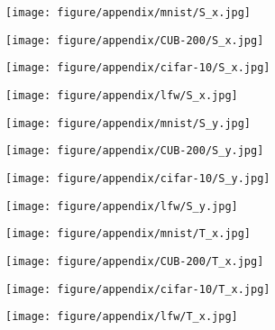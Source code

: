 \documentclass{article} \usepackage{iclr2017_conference,times}
\begin{document}
\begin{figure}[!ht]
\begin{minipage}{0.246\linewidth}
\center
\texttt{[image: figure/appendix/mnist/S\_x.jpg]}
\end{minipage}
\begin{minipage}{0.246\linewidth}
\center
\texttt{[image: figure/appendix/CUB-200/S\_x.jpg]}
\end{minipage}
\begin{minipage}{0.246\linewidth}
\center
\texttt{[image: figure/appendix/cifar-10/S\_x.jpg]}
\end{minipage}
\begin{minipage}{0.246\linewidth}
\center
\texttt{[image: figure/appendix/lfw/S\_x.jpg]}
\end{minipage}

\begin{minipage}{0.246\linewidth}
\center
\texttt{[image: figure/appendix/mnist/S\_y.jpg]}
\end{minipage}
\begin{minipage}{0.246\linewidth}
\center
\texttt{[image: figure/appendix/CUB-200/S\_y.jpg]}
\end{minipage}
\begin{minipage}{0.246\linewidth}
\center
\texttt{[image: figure/appendix/cifar-10/S\_y.jpg]}
\end{minipage}
\begin{minipage}{0.246\linewidth}
\center
\texttt{[image: figure/appendix/lfw/S\_y.jpg]}
\end{minipage}

\begin{minipage}{0.246\linewidth}
\center
\texttt{[image: figure/appendix/mnist/T\_x.jpg]}
\end{minipage}
\begin{minipage}{0.246\linewidth}
\center
\texttt{[image: figure/appendix/CUB-200/T\_x.jpg]}
\end{minipage}
\begin{minipage}{0.246\linewidth}
\center
\texttt{[image: figure/appendix/cifar-10/T\_x.jpg]}
\end{minipage}
\begin{minipage}{0.246\linewidth}
\center
\texttt{[image: figure/appendix/lfw/T\_x.jpg]}
\end{minipage}


\end{figure}
\end{document}
